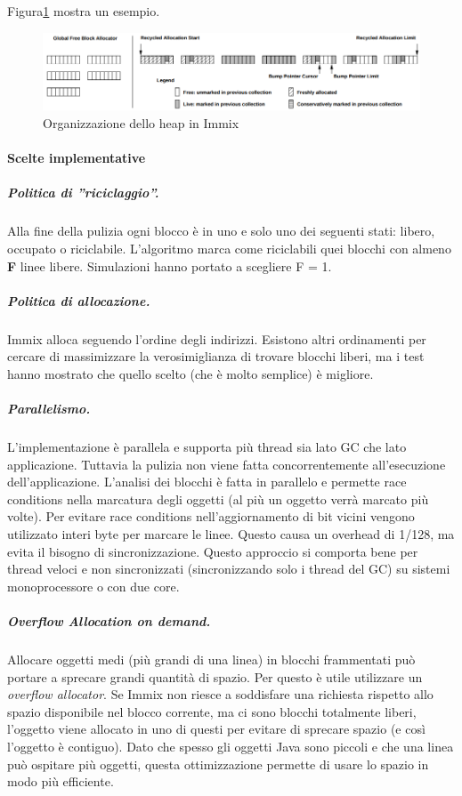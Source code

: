 Figura\ref{fig:immixheap} mostra un esempio.
\begin{figure}[h]
	\centering
	\includegraphics[width=1.2\linewidth]{images/immixHeap}
	\caption[Organizzazione dello heap]{Organizzazione dello heap in Immix}
	\label{fig:immixheap}
\end{figure}

\paragraph{Scelte implementative} 
\subparagraph{Politica di ''riciclaggio''.} Alla fine della pulizia ogni blocco è in uno e solo uno dei seguenti stati: libero, occupato o riciclabile. L'algoritmo marca come riciclabili quei blocchi con almeno \textbf{F} linee libere. Simulazioni hanno portato a scegliere F = 1.
\subparagraph{Politica di allocazione.} Immix alloca seguendo l'ordine degli indirizzi. Esistono altri ordinamenti per cercare di massimizzare la verosimiglianza di trovare blocchi liberi, ma i test hanno mostrato che quello scelto (che è molto semplice) è migliore. 
\subparagraph{Parallelismo.} L'implementazione è parallela e supporta più thread sia lato GC che lato applicazione. Tuttavia la pulizia non viene fatta concorrentemente all'esecuzione dell'applicazione. L'analisi dei blocchi è fatta in parallelo e permette race conditions nella marcatura degli oggetti (al più un oggetto verrà marcato più volte). Per evitare race conditions nell'aggiornamento di bit vicini vengono utilizzato interi byte per marcare le linee. Questo causa un overhead di 1/128, ma evita il bisogno di sincronizzazione. Questo approccio si comporta bene per thread veloci e non sincronizzati (sincronizzando solo i thread del GC) su sistemi monoprocessore o con due core. 
\subparagraph{Overflow Allocation on demand.} Allocare oggetti medi (più grandi di una linea) in blocchi frammentati può portare a sprecare grandi quantità di spazio. Per questo è utile utilizzare un \textit{overflow allocator}. Se Immix non riesce a soddisfare una richiesta rispetto allo spazio disponibile nel blocco corrente, ma ci sono blocchi totalmente liberi, l'oggetto viene allocato in uno di questi per evitare di sprecare spazio (e così l'oggetto è contiguo). Dato che spesso gli oggetti Java sono piccoli e che una linea può ospitare più oggetti, questa ottimizzazione permette di usare lo spazio in modo più efficiente.

